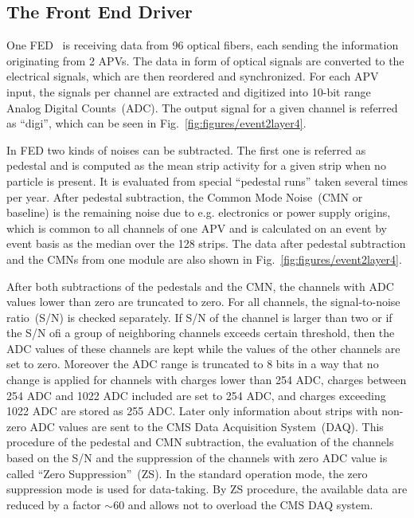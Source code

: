 
\subsection{The Front End Driver \label{sec:FED}}
One FED~\cite{Baird:2002wg} is receiving data from 96 optical fibers, each sending the information originating from 2 APVs. The data in form of optical signals are converted to the electrical signals, which are then reordered and synchronized. For each APV input, the signals per channel are extracted and digitized into 10-bit range Analog Digital Counts~(ADC). The output signal for a given channel is referred as ``digi'', which can be seen in Fig.~\ref{fig:figures/event2layer4}.

In FED two kinds of noises can be subtracted. The first one is referred as pedestal and is computed as the mean strip activity for a given strip when no particle is present. It is evaluated from special ``pedestal runs'' taken several times per year. After pedestal subtraction, the Common Mode Noise~(CMN or baseline) is the remaining noise due to e.g. electronics or power supply origins, which is common to all channels of one APV and is calculated on an event by event basis as the median over the 128 strips. The data after pedestal subtraction and the CMNs from one module are also shown in Fig.~\ref{fig:figures/event2layer4}. 

After both subtractions of the pedestals and the CMN, the channels with ADC values lower than zero are truncated to zero. For all channels, the signal-to-noise ratio~(S/N) is checked separately. If S/N of the channel is larger than two or if the S/N ofi a group of neighboring channels exceeds certain threshold, then the ADC values of these channels are kept while the values of the other channels are set to zero. Moreover the ADC range is truncated to 8 bits in a way that no change is applied for channels with charges lower than 254 ADC, charges between 254 ADC and 1022 ADC included are set to 254 ADC, and charges exceeding 1022 ADC are stored as 255 ADC. Later only information about strips with non-zero ADC values are sent to the CMS Data Acquisition System~(DAQ).  This procedure of the pedestal and CMN subtraction, the evaluation of the channels based on the S/N and the suppression of the channels with zero ADC value is called ``Zero Suppression''~(ZS). In the standard operation mode, the zero suppression mode is used for data-taking. By ZS procedure, the available data are reduced by a factor $\sim$60 and allows not to overload the CMS DAQ system.

